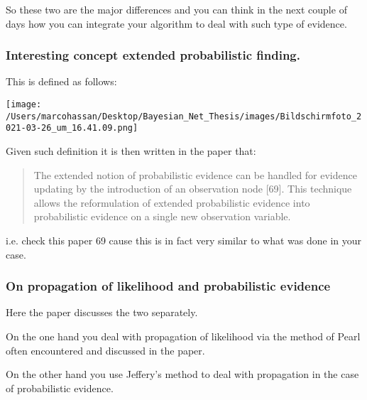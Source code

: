 \documentclass[a4paper]{article}
\begin{document}
So these two are the major differences and you can think in the
next couple of days how you can integrate your algorithm to deal
with such type of evidence.


\subsubsection{Interesting concept extended probabilistic finding.}
\label{sec:org87c2ef7}

This is defined as follows:

\begin{center}
\texttt{[image: /Users/marcohassan/Desktop/Bayesian\_Net\_Thesis/images/Bildschirmfoto\_2021-03-26\_um\_16.41.09.png]}
\end{center}


Given such definition it is then written in the paper that:

\begin{quote}
The extended notion of probabilistic evidence can be handled for
evidence updating by the introduction of an observation node
[69]. This technique allows the reformulation of extended
probabilistic evidence into probabilistic evidence on a single new
observation variable.
\end{quote}

i.e. check this paper 69 cause this is in fact very similar to
what was done in your case.



\subsubsection{On propagation of likelihood and probabilistic evidence}
\label{sec:org7d7a9a8}

Here the paper discusses the two separately.

On the one hand you deal with propagation of likelihood via the
method of Pearl often encountered and discussed in the paper.

On the other hand you use Jeffery's method to deal with
propagation in the case of probabilistic evidence.
\end{document}
